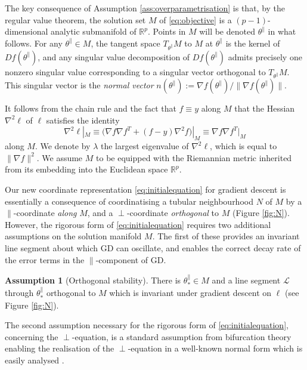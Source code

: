 \documentclass{article}
\newcommand{\RB}{\mathbb{R}}
\newcommand{\tpa}{\theta^{\parallel}}
\theoremstyle{plain}
\theoremstyle{definition}
\newtheorem{assumption}[theorem]{Assumption}
\theoremstyle{remark}
\begin{document}
The key consequence of Assumption \ref{ass:overparametrisation} is that, by the regular value theorem, the solution set $M$ of \eqref{eq:objective} is a $(p-1)$-dimensional analytic submanifold of $\RB^p$. Points in $M$ will be denoted $\tpa$ in what follows. For any $\tpa\in M$, the tangent space $T_{\tpa}M$ to $M$ at $\tpa$ is the kernel of $Df(\tpa)$, and any singular value decomposition of $Df(\tpa)$ admits precisely one nonzero singular value corresponding to a singular vector orthogonal to $T_{\tpa}M$. This singular vector is the \emph{normal vector} $n(\tpa):=\nabla f(\tpa)/\|\nabla f(\tpa)\|$.

It follows from the chain rule and the fact that $f\equiv y$ along $M$ that the Hessian $\nabla^2\ell$ of $\ell$ satisfies the identity
\begin{equation}
    \nabla^2\ell|_M \equiv \big(\nabla f\nabla f^T+(f-y)\nabla^2f\big)|_M \equiv \nabla f\nabla f^T|_M
\end{equation}
along $M$. We denote by $\lambda$ the largest eigenvalue of $\nabla^2\ell$, which is equal to $\|\nabla f\|^2$. We assume $M$ to be equipped with the Riemannian metric inherited from its embedding into the Euclidean space $\RB^p$.

Our new coordinate representation \eqref{eq:initialequation} for gradient descent is essentially a consequence of coordinatising a tubular neighbourhood $N$ of $M$ by a $\parallel$-coordinate \emph{along} $M$, and a $\perp$-coordinate \emph{orthogonal} to $M$ (Figure \ref{fig:N}). However, the rigorous form of \eqref{eq:initialequation} requires two additional assumptions on the solution manifold $M$. The first of these provides an invariant line segment about which GD can oscillate, and enables the correct decay rate of the error terms in the $\parallel$-component of GD.

\begin{assumption}[Orthogonal stability]\label{ass:orthogonal}
    There is $\tpa_*\in M$ and a line segment $\mathcal{L}$ through $\tpa_*$ orthogonal to $M$ which is invariant under gradient descent on $\ell$ (see Figure \ref{fig:N}).
\end{assumption}

The second assumption necessary for the rigorous form of \eqref{eq:initialequation}, concerning the $\perp$-equation, is a standard assumption from bifurcation theory enabling the realisation of the $\perp$-equation in a well-known normal form which is easily analysed \cite[Theorem 4.3]{kuznetsov}.
\end{document}

